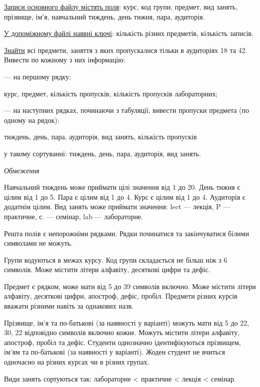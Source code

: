 \documentclass[11pt, ukrainian]{article}
\begin{document}
\underline{Записи основного файлу містять поля}: курс, код групи, предмет, вид занять, прізвище, ім’я, навчальний тиждень, день тижня, пара, аудиторія.

\underline{У допоміжному файлі наявні ключі}: кількість різних предметів, кількість записів.

\underline{Знайти} всі предмети, заняття з яких пропускалися тільки в аудиторіях 18 та 42. Вивести по кожному з них інформацію:\par
{\noindent}--- на першому рядку:\par
курс, предмет, кількість пропусків, кількість пропусків лабораторних;

{\noindent}--- на наступних рядках, починаючи з табуляції, вивести пропуски предмета (по одному на рядок):\par
тиждень, день, пара, аудиторія, вид занять, кількість пропусків

{\noindent}у такому сортуванні: тиждень, день, пара, аудиторія, вид занять.


\bigskip\textit{Обмеження}

Навчальний тиждень може приймати цілі значення від 1 до 20.
День тижня є цілим від 1 до 5. Пара є цілим від 1 до 4.
Курс є цілим від 1 до 4. Аудиторія є додатнім цілим.
Вид занять може приймати значення:
lect --- лекція, P --- практичне, с. --- семінар, lab --- лабораторне.

Решта полів є непорожніми рядками.
Рядки починатися та закінчуватися білими символами не можуть.

Групи кодуються в межах курсу.
Код групи складається не більш ніж з 6 символів.
Може містити літери алфавіту, десяткові цифри та дефіс.

Предмет є рядком, може мати від 5 до 39 символів включно.
Може містити літери алфавіту, десяткові цифри, апостроф, дефіс, пробіл.
Предмети різних курсів вважати різними навіть за однакових назв.

Прізвище, ім’я та по-батькові (за наявності у варіанті)
можуть мати від 5 до 22, 30, 22 відповідно символів включно кожне.
Можуть містити літери алфавіту, апостроф, пробіл та дефіс.
Студенти однозначно ідентифікуються прізвищем, ім’ям та по-батькові (за наявності у варіанті).
Жоден студент не вчиться одночасно на різних курсах чи в різних групах.

Види занять сортуються так: лабораторне < практичне < лекція < семінар.

\end{document}
